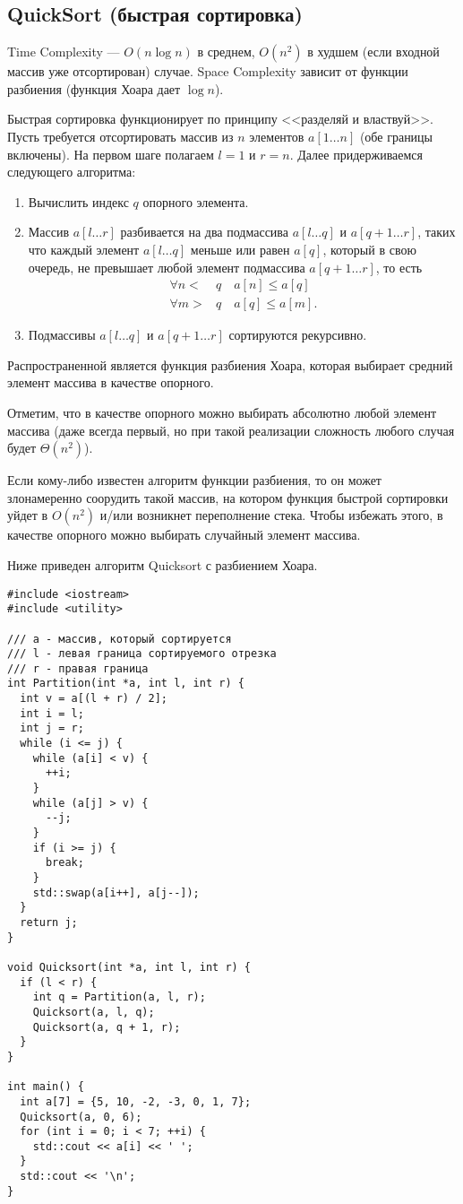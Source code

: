 \subsection{QuickSort (быстрая сортировка)}
Time Complexity --- $O(n\log n)$ в среднем, $O(n^2)$
в худшем (если входной массив уже отсортирован) случае. Space Complexity зависит 
от функции разбиения (функция Хоара дает $\log n$).

Быстрая сортировка функционирует по принципу <<разделяй и властвуй>>.
Пусть требуется отсортировать массив из $n$ элементов $a[1\dots n]$ (обе границы включены).
На первом шаге полагаем $l=1$ и $r=n$. Далее придерживаемся следующего алгоритма:
\begin{enumerate}
  \item Вычислить индекс $q$ опорного элемента.
  \item Массив $a[l\dots r]$
  разбивается на два подмассива $a[l\dots q]$ и $a[q+1\dots r]$, таких что каждый элемент $a[l\dots q]$
  меньше или равен $a[q]$, который в свою очередь, не превышает любой элемент подмассива $a[q+1\dots r]$, то есть
  \begin{align*}
    \forall n <& q \quad a[n] \leq a[q] \\
    \forall m >& q \quad a[q] \leq a[m].
  \end{align*}
  \item Подмассивы $a[l\dots q]$ и $a[q+1\dots r]$ сортируются рекурсивно.
\end{enumerate}

Распространенной является функция разбиения Хоара, которая выбирает средний элемент массива
в качестве опорного.

Отметим, что в качестве опорного можно выбирать абсолютно любой элемент массива
(даже всегда первый, но при такой реализации сложность любого случая будет $\Theta(n^2)$).

Если кому-либо известен алгоритм функции разбиения, то он может злонамеренно соорудить
такой массив, на котором функция быстрой сортировки уйдет в $O(n^2)$ и/или возникнет
переполнение стека. Чтобы избежать этого, в качестве опорного можно выбирать случайный
элемент массива.

Ниже приведен алгоритм Quicksort с разбиением Хоара.
\begin{verbatim}
#include <iostream>
#include <utility>

/// a - массив, который сортируется
/// l - левая граница сортируемого отрезка
/// r - правая граница
int Partition(int *a, int l, int r) {
  int v = a[(l + r) / 2];
  int i = l;
  int j = r;
  while (i <= j) {
    while (a[i] < v) {
      ++i;
    }
    while (a[j] > v) {
      --j;
    }
    if (i >= j) {
      break;
    }
    std::swap(a[i++], a[j--]);
  }
  return j;
}

void Quicksort(int *a, int l, int r) {
  if (l < r) {
    int q = Partition(a, l, r);
    Quicksort(a, l, q);
    Quicksort(a, q + 1, r);
  }
}

int main() {
  int a[7] = {5, 10, -2, -3, 0, 1, 7};
  Quicksort(a, 0, 6);
  for (int i = 0; i < 7; ++i) {
    std::cout << a[i] << ' ';
  }
  std::cout << '\n';
}
\end{verbatim}

